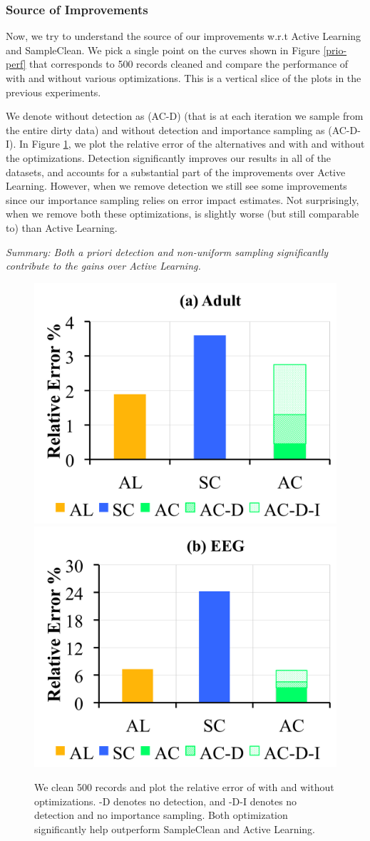 \subsubsection{Source of Improvements}
Now, we try to understand the source of our improvements w.r.t Active Learning and SampleClean.
We pick a single point on the curves shown in Figure \ref{prio-perf} that corresponds to 500 records cleaned and compare the performance of \sys with and without various optimizations.
This is a vertical slice of the plots in the previous experiments.

We denote \sys without detection as (AC-D) (that is at each iteration we sample from the entire dirty data) and \sys without detection and importance sampling as (AC-D-I).
In Figure \ref{opts}, we plot the relative error of the alternatives and \sys with and without the optimizations.
Detection significantly improves our results in all of the datasets, and accounts for a substantial part of the improvements over Active Learning.
However, when we remove detection we still see some improvements since our importance sampling relies on error impact estimates.
Not surprisingly, when we remove both these optimizations, \sys is slightly worse (but still comparable to) than Active Learning.

\vspace{0.25em}

\noindent \emph{Summary: Both a priori detection and non-uniform sampling significantly contribute to the gains over Active Learning.}

\begin{figure}[ht!]
\centering
 \includegraphics[width=0.49\columnwidth]{exp/exp8a.png}
 \includegraphics[width=0.49\columnwidth]{exp/exp8b.png}
 \caption{We clean 500 records and plot the relative error of \sys with and without optimizations. -D denotes no detection, and -D-I denotes no detection and no importance sampling. Both optimization significantly help \sys outperform SampleClean and Active Learning. \label{opts}}
\end{figure}

